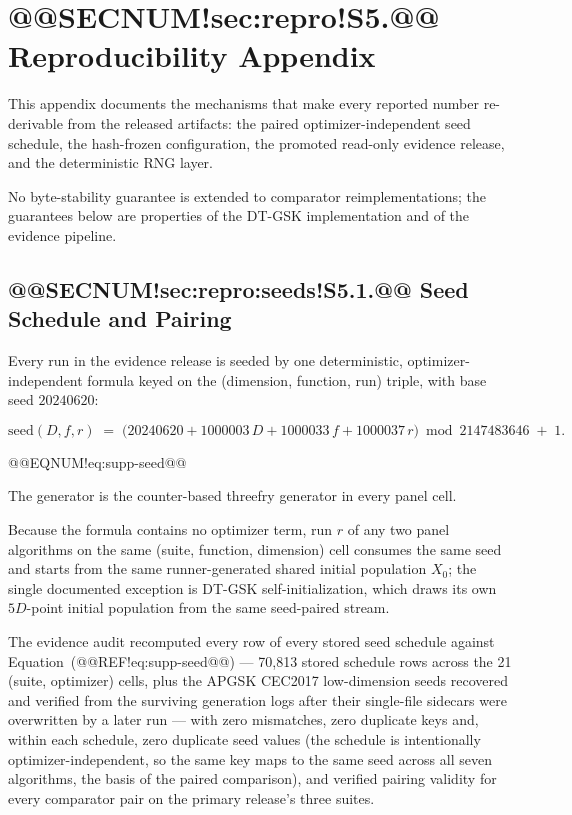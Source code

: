\documentclass[10pt,a4paper]{article}
\newcommand{\dtgsk}{DT-GSK}
\begin{document}
\section{@@SECNUM!sec:repro!S5.@@ Reproducibility Appendix}\label{sec:repro}


This appendix documents the mechanisms that make every reported number
re-derivable from the released artifacts: the paired
optimizer-independent seed schedule, the hash-frozen configuration, the
promoted read-only evidence release, and the deterministic RNG layer.

No byte-stability guarantee is extended to comparator
reimplementations; the guarantees below are properties of the \dtgsk{}
implementation and of the evidence pipeline.


\subsection{@@SECNUM!sec:repro:seeds!S5.1.@@ Seed Schedule and Pairing}\label{sec:repro:seeds}

Every run in the evidence release is seeded by one deterministic,
optimizer-independent formula keyed on the (dimension, function, run)
triple, with base seed $20240620$:


\[
\mathrm{seed}(D, f, r) \;=\;
\bigl(20240620 + 1000003\,D + 1000033\,f + 1000037\,r\bigr)
\bmod 2147483646 \;+\; 1 .
\]

@@EQNUM!eq:supp-seed@@


The generator is the counter-based threefry generator in every
panel cell.

Because the formula contains no optimizer term, run $r$ of any two panel
algorithms on the same (suite, function, dimension) cell consumes the
same seed and starts from the same runner-generated shared initial
population $X_{0}$; the single documented exception is \dtgsk{}
self-initialization, which draws its own $5D$-point initial population
from the same seed-paired stream.

The evidence audit recomputed every row of every stored seed
schedule against Equation~(@@REF!eq:supp-seed@@) --- 70{,}813 stored schedule rows
across the 21 (suite, optimizer) cells, plus the APGSK CEC2017
low-dimension seeds recovered and verified from the surviving generation
logs after their single-file sidecars were overwritten by a later run --- with zero mismatches, zero
duplicate keys and, within each schedule, zero duplicate seed values (the
schedule is intentionally optimizer-independent, so the same key maps to
the same seed across all seven algorithms, the basis of the paired
comparison), and verified pairing validity for every comparator pair on
the primary release's three suites.
\end{document}
